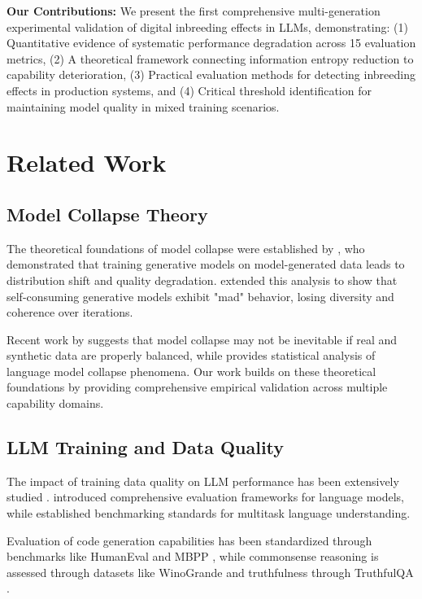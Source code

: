 \documentclass{article}
\begin{document}
\textbf{Our Contributions:} We present the first comprehensive multi-generation experimental validation of digital inbreeding effects in LLMs, demonstrating: (1) Quantitative evidence of systematic performance degradation across 15 evaluation metrics, (2) A theoretical framework connecting information entropy reduction to capability deterioration, (3) Practical evaluation methods for detecting inbreeding effects in production systems, and (4) Critical threshold identification for maintaining model quality in mixed training scenarios.

\section{Related Work}

\subsection{Model Collapse Theory}

The theoretical foundations of model collapse were established by \citet{shumailov2023curse}, who demonstrated that training generative models on model-generated data leads to distribution shift and quality degradation. \citet{alemohammad2023self} extended this analysis to show that self-consuming generative models exhibit "mad" behavior, losing diversity and coherence over iterations.

Recent work by \citet{gerstgrasser2024model} suggests that model collapse may not be inevitable if real and synthetic data are properly balanced, while \citet{seddik2024bad} provides statistical analysis of language model collapse phenomena. Our work builds on these theoretical foundations by providing comprehensive empirical validation across multiple capability domains.

\subsection{LLM Training and Data Quality}

The impact of training data quality on LLM performance has been extensively studied \citep{hoffmann2022training,muennighoff2022crosslingual}. \citet{liang2022holistic} introduced comprehensive evaluation frameworks for language models, while \citet{hendrycks2020measuring} established benchmarking standards for multitask language understanding.

Evaluation of code generation capabilities has been standardized through benchmarks like HumanEval \citep{chen2021evaluating} and MBPP \citep{austin2021program}, while commonsense reasoning is assessed through datasets like WinoGrande \citep{sakaguchi2020winogrande} and truthfulness through TruthfulQA \citep{lin2022truthfulqa}.
\end{document}
